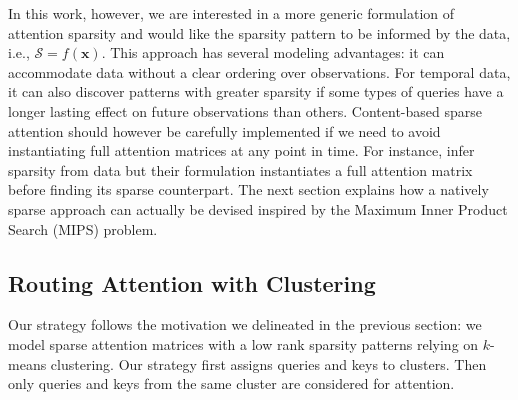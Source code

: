 \documentclass[a4paper]{article}
\begin{document}
In this work, however, we are interested in a more generic formulation of attention
sparsity and would like the sparsity pattern to be informed by the data, 
i.e., \(\mathcal{S} = f(\mathbf{x})\). 
This approach has several modeling advantages: it can accommodate data without 
a clear ordering over observations. For temporal data, it can also discover 
patterns with greater sparsity if some types of queries have a longer lasting 
effect on future observations than others.
Content-based sparse attention should however be carefully implemented if we
need to avoid instantiating full attention matrices at any point in time.
For instance, \citet{correia2019adaptively} infer sparsity from data but their 
formulation instantiates a full attention matrix before finding its sparse counterpart.
The next section explains how a natively sparse approach can actually be devised
inspired by the Maximum Inner Product Search (MIPS) problem.

\subsection{Routing Attention with Clustering}\label{sec:routing}
Our strategy follows the motivation we delineated in the previous section:
we model sparse attention matrices with a low rank sparsity patterns relying 
on \(k\)-means clustering. Our strategy first assigns queries and keys to clusters.
Then only queries and keys from the same cluster are considered for attention.
\end{document}
